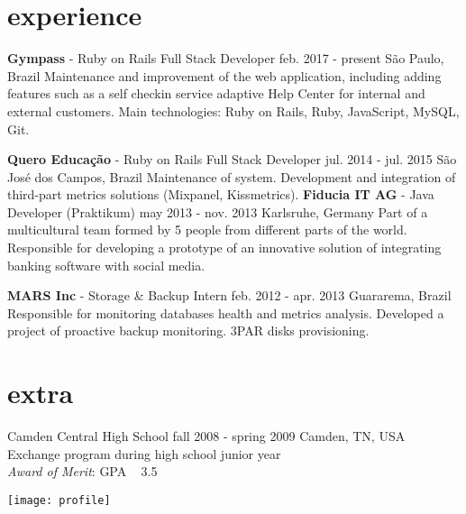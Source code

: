 \documentclass[]{friggeri-cv}
\begin{document}
\section{experience}

\begin{entrylist}
  \entry
  {\textbf{Gympass} - Ruby on Rails Full Stack Developer}
  {feb. 2017 - present}
  {São Paulo, Brazil}
  { Maintenance and improvement of the web application, including adding features such as a self checkin service adaptive Help Center for internal and external customers. Main technologies: Ruby on Rails, Ruby, JavaScript, MySQL, Git.}
  
  \entry
    {\textbf{Quero Educação} - Ruby on Rails Full Stack Developer}
    {jul. 2014 - jul. 2015}
    {São José dos Campos, Brazil}
  { Maintenance of system. Development and integration of third-part metrics solutions (Mixpanel, Kissmetrics).}
  \entry
  	{\textbf{Fiducia IT AG} - Java Developer (Praktikum)}
    {may 2013 - nov. 2013}
    {Karlsruhe, Germany}
    {Part of a multicultural team formed by 5 people from different parts of the world. Responsible for developing a prototype of an innovative solution of integrating banking software with social media.}

  \entry
    {\textbf{MARS Inc} - Storage \& Backup Intern}
    {feb. 2012 - apr. 2013}
    {Guararema, Brazil}
    {Responsible for monitoring databases health and metrics analysis. Developed a project of proactive backup monitoring.  3PAR disks provisioning.}

\end{entrylist}

\section{extra}

\begin{entrylist}
  \entry
    {Camden Central High School}
    {fall 2008 - spring 2009}
    {Camden, TN, USA}
    {Exchange program during high school junior year\\
    \textit{Award of Merit}: GPA \geq ~ 3.5}\\


\end{entrylist}

\begin{rside}
 \texttt{[image: profile]}
\end{rside}
\end{document}
